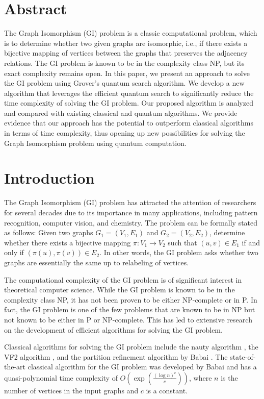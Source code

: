 \section*{Abstract}

The Graph Isomorphism (GI) problem is a classic computational problem, which is to determine whether two given graphs are isomorphic, i.e., if there exists a bijective mapping of vertices between the graphs that preserves the adjacency relations. The GI problem is known to be in the complexity class NP, but its exact complexity remains open. In this paper, we present an approach to solve the GI problem using Grover's quantum search algorithm. We develop a new algorithm that leverages the efficient quantum search to significantly reduce the time complexity of solving the GI problem. Our proposed algorithm is analyzed and compared with existing classical and quantum algorithms. We provide evidence that our approach has the potential to outperform classical algorithms in terms of time complexity, thus opening up new possibilities for solving the Graph Isomorphism problem using quantum computation.

\section{Introduction}

The Graph Isomorphism (GI) problem has attracted the attention of researchers for several decades due to its importance in many applications, including pattern recognition, computer vision, and chemistry. The problem can be formally stated as follows: Given two graphs $G_1 = (V_1, E_1)$ and $G_2 = (V_2, E_2)$, determine whether there exists a bijective mapping $\pi: V_1 \rightarrow V_2$ such that $(u, v) \in E_1$ if and only if $(\pi(u), \pi(v)) \in E_2$. In other words, the GI problem asks whether two graphs are essentially the same up to relabeling of vertices.

The computational complexity of the GI problem is of significant interest in theoretical computer science. While the GI problem is known to be in the complexity class NP, it has not been proven to be either NP-complete or in P. In fact, the GI problem is one of the few problems that are known to be in NP but not known to be either in P or NP-complete. This has led to extensive research on the development of efficient algorithms for solving the GI problem.

Classical algorithms for solving the GI problem include the nauty algorithm \cite{nauty}, the VF2 algorithm \cite{vf2}, and the partition refinement algorithm by Babai \cite{babai}. The state-of-the-art classical algorithm for the GI problem was developed by Babai \cite{babai} and has a quasi-polynomial time complexity of $O\left(\exp\left(\frac{(\log n)^{c}}{c}\right)\right)$, where $n$ is the number of vertices in the input graphs and $c$ is a constant.

